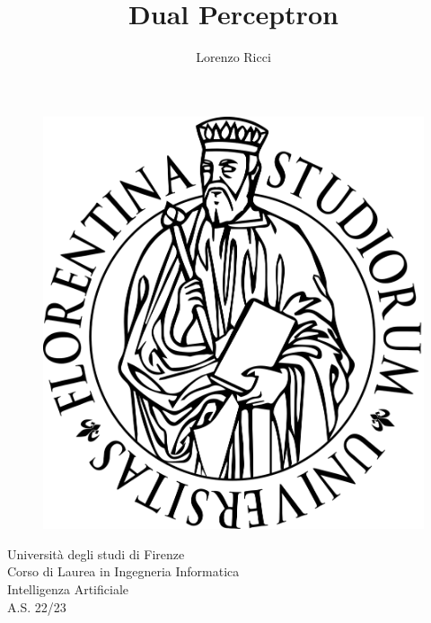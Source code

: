 \documentclass{article}
\author{\large{Lorenzo Ricci}}
\title{\textbf{\fontsize{34pt}{45pt}\selectfont Dual Perceptron}}
\date{}
\begin{document}
	\begin{figure}
		\centering
		\includegraphics[width=0.7\linewidth]{Unifi_nuovo.svg.png}
		\label{fig:unifinuovo}
	\end{figure}
	\maketitle
	\vspace*{2cm}
	\begin{center}
		\Large Università degli studi di Firenze\\ Corso di Laurea in Ingegneria Informatica\\ Intelligenza Artificiale\\ A.S. 22/23
	\end{center}
	\tableofcontents \newpage
\end{document}
